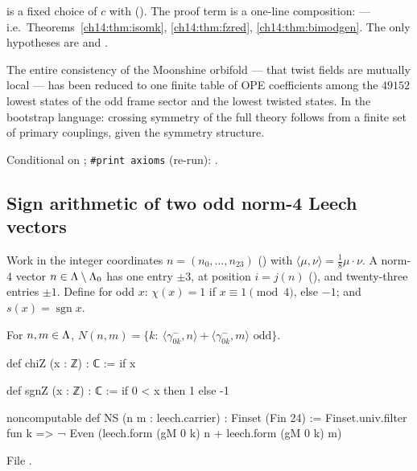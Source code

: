 \begin{dictionary}
 is a fixed choice of $c$ with  ().  The proof
term is a one-line composition:  — i.e.\ Theorems~\ref{ch14:thm:isomk}, \ref{ch14:thm:fzred},
\ref{ch14:thm:bimodgen}.  The only hypotheses are  and .
\end{dictionary}

\begin{physics}
The entire consistency of the Moonshine orbifold — that twist fields are mutually local — has been
reduced to one finite table of OPE coefficients among the $49152$ lowest states of the odd frame sector
and the lowest twisted states.  In the bootstrap language: crossing symmetry of the full theory follows
from a finite set of primary couplings, given the symmetry structure.
\end{physics}

\begin{status}
Conditional on ; \texttt{\#print axioms} (re-run): .
\end{status}

\subsection{Sign arithmetic of two odd norm-4 Leech vectors}

Work in the integer coordinates $n=(n_0,\dots,n_{23})$ () with $\langle\mu,\nu\rangle=\tfrac18\mu\cdot\nu$.
A norm-4 vector $n\in{\Lambda}\setminus{\Lambda}_0$ has one entry $\pm3$, at position $i=j(n)$ (), and
twenty-three entries $\pm1$.  Define for odd $x$: $\chi(x)=1$ if $x\equiv1\pmod4$, else $-1$; and
$s(x)=\operatorname{sgn}x$.

\begin{definition}\label{ch14:def:NS}
For $n,m\in{\Lambda}$, $N(n,m)=\{k:\ \langle\gamma^-_{0k},n\rangle+\langle\gamma^-_{0k},m\rangle\text{ odd}\}$.
\end{definition}
\begin{leancode}
def chiZ (x : ℤ) : ℂ := if x %

def sgnZ (x : ℤ) : ℂ := if 0 < x then 1 else -1

noncomputable def NS (n m : leech.carrier) : Finset (Fin 24) :=
  Finset.univ.filter fun k => ¬ Even (leech.form (gM 0 k) n + leech.form (gM 0 k) m)
\end{leancode}
File .

